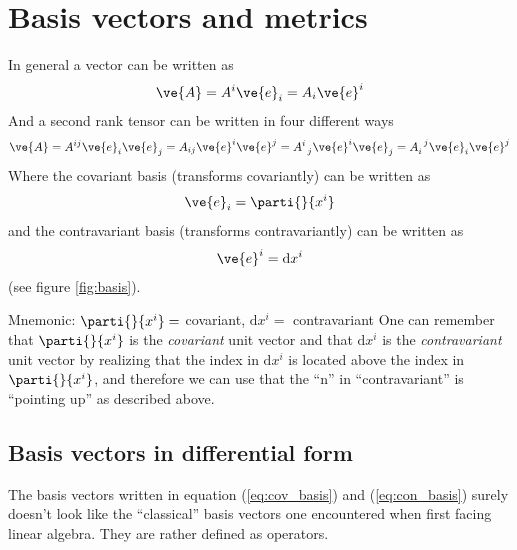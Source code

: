 \documentclass[a4paper, 12pt]{article}
\begin{document}
\section{Basis vectors and metrics}
In general a vector can be written as
%
\begin{align*}
 \ve{A} = A^i\ve{e}_i = A_i\ve{e}^i
\end{align*}
%
And a second rank tensor can be written in four different ways
%
\begin{align*}
 \ve{A} = 
 A^{ij}\ve{e}_i\ve{e}_j =
 A_{ij}\ve{e}^i\ve{e}^j =
 A^{i}_{\;\;j}\ve{e}^i\ve{e}_j =
 A_{i}^{\;\;j}\ve{e}_i\ve{e}^j
\end{align*}
%
Where the covariant basis (transforms covariantly) can be written as
%
\begin{align}
 \ve{e}_i = \parti{}{x^i} \label{eq:cov_basis}
\end{align}
%
and the contravariant basis (transforms contravariantly) can be written as
%
\begin{align}
 \ve{e}^i = \text{d}x^i \label{eq:con_basis}
\end{align}
%
(see figure \ref{fig:basis}).

\vspace{0.5cm}
\begin{greenbox}{Mnemonic: $\parti{}{x^i} = $ covariant,  $\text{d}x^i = $ 
contravariant }
 One can remember that $\parti{}{x^i}$ is the \emph{covariant} unit vector 
and that $\text{d}x^i$ is the \emph{contravariant} unit vector by realizing 
that the index in $\text{d}x^i$ is located above the index in $\parti{}{x^i}$, 
and therefore we can use that the ``n'' in ``contravariant'' is ``pointing up'' 
as described above.
\end{greenbox}


\subsection{Basis vectors in differential form}\label{sec:bvdf}
The basis vectors written in equation (\ref{eq:cov_basis}) and 
(\ref{eq:con_basis}) surely doesn't look like the ``classical'' basis vectors 
one encountered when first facing linear algebra. They are rather defined as 
operators. 
\end{document}
